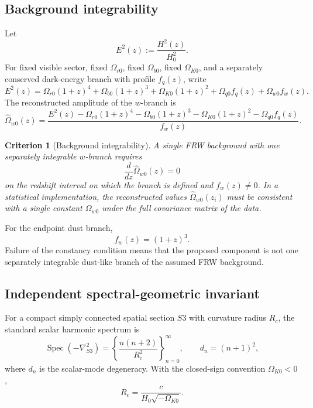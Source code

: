 \documentclass[11pt,a4paper]{article}
\def\Sthree{S3}%
\def\dd{d}%
\numberwithin{equation}{section}
\newtheorem{criterion}{Criterion}
\theoremstyle{remark}
\newcommand{\Sthree}{S^3}
\newcommand{\dd}{\mathrm{d}}
\begin{document}
\subsection{Background integrability}

Let
\begin{equation}
E^2(z):=\frac{H^2(z)}{H_0^2}.
\end{equation}
For fixed visible sector, fixed \(\Omega_{r0}\), fixed \(\Omega_{b0}\), fixed \(\Omega_{K0}\), and a separately conserved dark-energy branch with profile \(f_q(z)\), write
\begin{equation}
E^2(z)=
\Omega_{r0}(1+z)^4
+\Omega_{b0}(1+z)^3
+\Omega_{K0}(1+z)^2
+\Omega_{q0}f_q(z)
+\Omega_{w0}f_w(z).
\end{equation}
The reconstructed amplitude of the \(w\)-branch is
\begin{equation}
\widehat{\Omega}_{w0}(z)
=
\frac{
E^2(z)
-\Omega_{r0}(1+z)^4
-\Omega_{b0}(1+z)^3
-\Omega_{K0}(1+z)^2
-\Omega_{q0}f_q(z)
}{
f_w(z)
}.
\end{equation}

\begin{criterion}[Background integrability]
A single FRW background with one separately integrable \(w\)-branch requires
\begin{equation}
\frac{\dd}{\dd z}\widehat{\Omega}_{w0}(z)=0
\end{equation}
on the redshift interval on which the branch is defined and \(f_w(z)\neq0\). In a statistical implementation, the reconstructed values \(\widehat{\Omega}_{w0}(z_i)\) must be consistent with a single constant \(\Omega_{w0}\) under the full covariance matrix of the data.
\end{criterion}

For the endpoint dust branch,
\begin{equation}
f_w(z)=(1+z)^3.
\end{equation}
Failure of the constancy condition means that the proposed component is not one separately integrable dust-like branch of the assumed FRW background.

\subsection{Independent spectral-geometric invariant}

For a compact simply connected spatial section \(\Sthree\) with curvature radius \(R_c\), the standard scalar harmonic spectrum is \cite{HalliwellHawking1985,KodamaSasaki1984}
\begin{equation}
\operatorname{Spec}(-\nabla^2_{\Sthree})
=
\left\{
\frac{n(n+2)}{R_c^2}
\right\}_{n=0}^{\infty},
\qquad
 d_n=(n+1)^2,
\end{equation}
where \(d_n\) is the scalar-mode degeneracy. With the closed-sign convention \(\Omega_{K0}<0\),
\begin{equation}
R_c=\frac{c}{H_0\sqrt{-\Omega_{K0}}}.
\end{equation}
\end{document}
